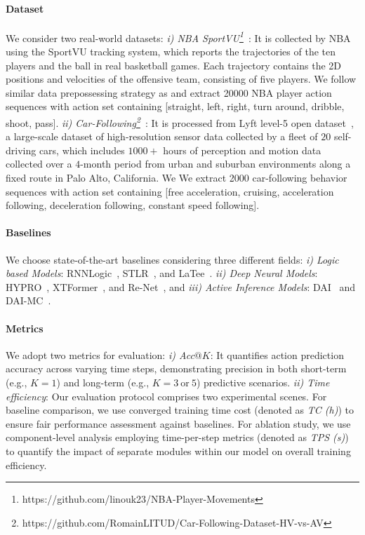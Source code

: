 \documentclass{article} %
\begin{document}
\paragraph{Dataset} We consider two real-world datasets: {\it i) NBA SportVU\footnote{https://github.com/linouk23/NBA-Player-Movements}}~\citep{kambhamettu2024quantifying}: It is collected by NBA using the SportVU tracking system, which reports the trajectories of the ten players and the ball in real basketball games. Each trajectory contains the
2D positions and velocities of the offensive team, consisting of five players. We follow similar data prepossessing strategy as \cite{cao2023discovering} and extract 20000 NBA player action sequences with action set containing [straight, left,
right, turn around, dribble, shoot, pass].
{\it ii) Car-Following\footnote{https://github.com/RomainLITUD/Car-Following-Dataset-HV-vs-AV}}~\citep{li2023large}: It is processed from Lyft level-5 open dataset~\citep{houston2021one}, a large-scale dataset of high-resolution sensor data collected by a fleet of $20$ self-driving cars, which includes $1000+$ hours of perception and motion data collected over a $4$-month period from urban and suburban environments along a fixed route in Palo Alto, California. We We extract 2000 car-following behavior sequences with action set containing [free acceleration, cruising, acceleration following, deceleration following, constant speed following]. 

\paragraph{Baselines} We choose state-of-the-art baselines considering three different fields: {\it i) Logic based Models}: RNNLogic~\citep{qu2020rnnlogic}, STLR~\citep{cao2023discovering}, and LaTee~\citep{song2024latent}. {\it ii) Deep Neural Models}: HYPRO~\citep{xue2022hypro}, XTFormer~\citep{xiao2025xtsformer}, and Re-Net~\citep{jin2019recurrent}, and {\it iii) Active Inference Models}: DAI~\citep{ccatal2020learning} and DAI-MC~\citep{fountas2020deep}.

\paragraph{Metrics} We adopt two metrics for evaluation: {\it i) Acc$@K$}:
It quantifies action prediction accuracy across varying time steps, demonstrating precision in both short-term (e.g., $K=1$) and long-term (e.g., $K=3\ \text{or} \ 5$) predictive scenarios. {\it ii) Time efficiency}: Our evaluation protocol comprises two experimental scenes. For baseline comparison, we use converged training time cost (denoted as {\it TC (h)}) to ensure fair performance assessment against baselines. For ablation study, we use component-level analysis employing time-per-step metrics (denoted as {\it TPS (s)}) to quantify the impact of separate modules within our model on overall training efficiency.
\end{document}
